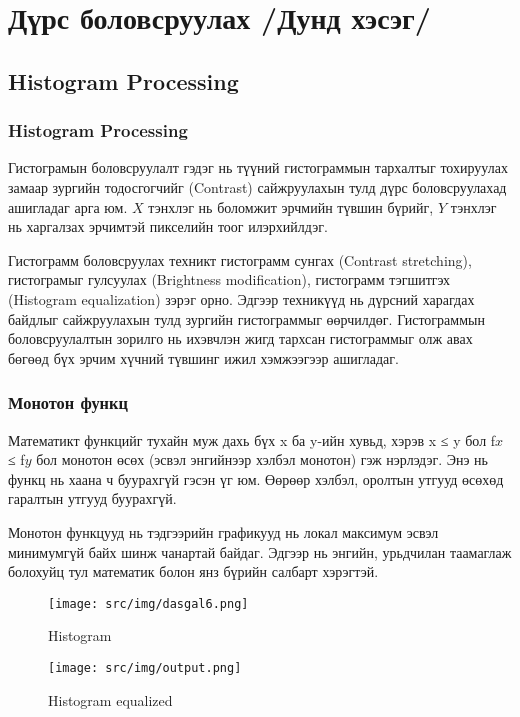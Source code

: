 \chapter{Дүрс боловсруулах /Дунд хэсэг/}

\section{Histogram Processing}
\subsection{Histogram Processing}
Гистограмын боловсруулалт гэдэг нь түүний гистограммын тархалтыг тохируулах замаар
зургийн тодосгогчийг (Contrast) сайжруулахын тулд дүрс боловсруулахад ашигладаг арга юм.
\textbf{\(X\)} тэнхлэг нь боломжит эрчмийн түвшин бүрийг, \textbf{\(Y\)} тэнхлэг
нь харгалзах эрчимтэй пикселийн тоог илэрхийлдэг.

Гистограмм боловсруулах техникт гистограмм сунгах (Contrast stretching),
гистограмыг гулсуулах (Brightness modification), гистограмм тэгшитгэх (Histogram equalization)
зэрэг орно. Эдгээр техникүүд нь дүрсний харагдах байдлыг
сайжруулахын тулд зургийн гистограммыг өөрчилдөг. Гистограммын
боловсруулалтын зорилго нь ихэвчлэн жигд тархсан гистограммыг олж авах бөгөөд бүх
эрчим хүчний түвшинг ижил хэмжээгээр ашигладаг\cite{histogram}.

\subsection{Монотон функц}
Математикт функцийг тухайн муж дахь бүх x ба y-ийн хувьд, хэрэв
x ≤ y бол f\(x\) ≤ f\(y\) бол монотон өсөх (эсвэл энгийнээр хэлбэл монотон) гэж
нэрлэдэг. Энэ нь функц нь хаана ч буурахгүй гэсэн үг юм. Өөрөөр хэлбэл,
оролтын утгууд өсөхөд гаралтын утгууд буурахгүй.

Монотон функцууд нь тэдгээрийн графикууд нь локал
максимум эсвэл минимумгүй байх шинж чанартай байдаг. Эдгээр
нь энгийн, урьдчилан таамаглаж болохуйц тул математик
болон янз бүрийн салбарт хэрэгтэй\cite{monoton}.

\begin{figure}
    \centering
    \texttt{[image: src/img/dasgal6.png]}
    \caption{Histogram}
\end{figure}
\begin{figure}
    \centering
    \texttt{[image: src/img/output.png]}
    \caption{Histogram equalized}
\end{figure}

